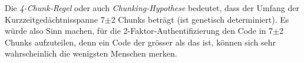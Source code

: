 Die \textit{4-Chunk-Regel} oder auch \textit{Chunking-Hypothese}
bedeutet, dass der Umfang der Kurzzeitgedächtnis­spanne 7\(\pm\)2 Chunks beträgt (ist genetisch
determiniert). Es würde also Sinn machen, für die 2-Faktor-Authentifizierung den Code in
7\(\pm\)2 Chunks aufzuteilen, denn ein Code der grösser als das ist, können sich sehr 
wahrscheinlich die wenigsten Menschen merken. 